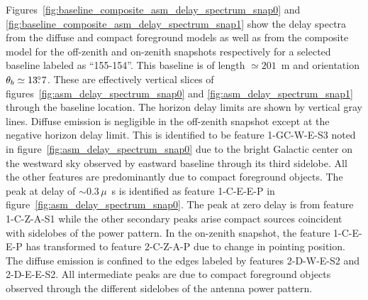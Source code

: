 \documentclass[preprint2,iop,numberedappendix]{emulateapj}
\begin{document}
Figures~\ref{fig:baseline_composite_asm_delay_spectrum_snap0} and \ref{fig:baseline_composite_asm_delay_spectrum_snap1} show the delay spectra from the diffuse and compact foreground models as well as from the composite model for the off-zenith and on-zenith snapshots respectively for a selected baseline labeled as ``155-154''. This baseline is of length $\simeq 201$~m and orientation $\theta_b\simeq 13\mbox{$.\!\!^\circ$} 7$. These are effectively vertical slices of figures~\ref{fig:asm_delay_spectrum_snap0} and \ref{fig:asm_delay_spectrum_snap1} through the baseline location. The horizon delay limits are shown by vertical gray lines. Diffuse emission is negligible in the off-zenith snapshot except at the negative horizon delay limit. This is identified to be feature 1-GC-W-E-S3 noted in figure~\ref{fig:asm_delay_spectrum_snap0} due to the bright Galactic center on the westward sky observed by eastward baseline through its third sidelobe. All the other features are predominantly due to compact foreground objects. The peak at delay of $\sim 0.3\,\mu$~s is identified as feature 1-C-E-E-P in figure~\ref{fig:asm_delay_spectrum_snap0}. The peak at zero delay is from feature 1-C-Z-A-S1 while the other secondary peaks arise compact sources coincident with sidelobes of the power pattern. In the on-zenith snapshot, the feature 1-C-E-E-P has transformed to feature 2-C-Z-A-P due to change in pointing position. The diffuse emission is confined to the edges labeled by features 2-D-W-E-S2 and 2-D-E-E-S2. All intermediate peaks are due to compact foreground objects observed through the different sidelobes of the antenna power pattern. 
\end{document}
